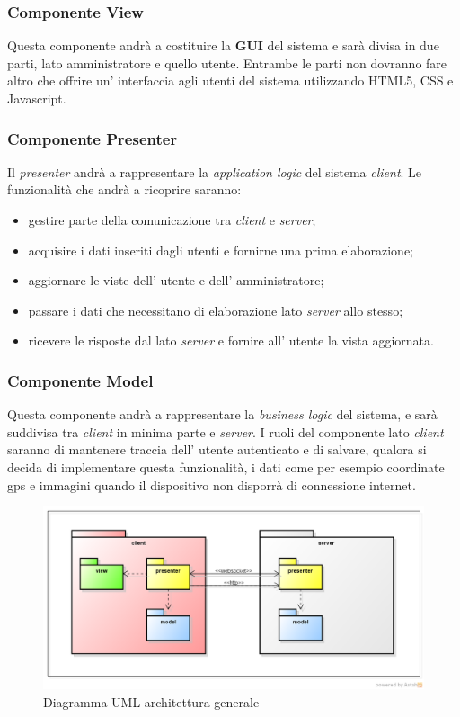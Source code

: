 \subsubsection{Componente View}
Questa componente andrà a costituire la \textbf{GUI} del sistema e sarà divisa in due parti, lato amministratore e quello utente. Entrambe le parti non dovranno fare altro che offrire un' interfaccia agli utenti del sistema utilizzando HTML5, CSS e Javascript.
\subsubsection{Componente Presenter}
Il \textit{presenter} andrà a rappresentare la \textit{application logic} del sistema \textit{client}. Le funzionalità che andrà a ricoprire saranno:
\begin{itemize}
	\item gestire parte della comunicazione tra \textit{client} e \textit{server};
	\item acquisire i dati inseriti dagli utenti e fornirne una prima elaborazione;
	\item aggiornare le viste dell' utente e dell' amministratore;
	\item passare i dati che necessitano di elaborazione lato \textit{server} allo stesso;
	\item ricevere le risposte dal lato \textit{server} e fornire all' utente la vista aggiornata.
\end{itemize}
\subsubsection{Componente Model}
Questa componente andrà a rappresentare la \textit{business logic} del sistema, e sarà suddivisa tra \textit{client} in minima parte e \textit{server}.
I ruoli del componente lato \textit{client} saranno di mantenere traccia dell' utente autenticato e di salvare, qualora si decida di implementare questa funzionalità, i dati come per esempio coordinate gps e immagini quando il dispositivo non disporrà di connessione internet.

\begin{figure}[H] \centering \includegraphics[width=%
\textwidth]
{./other/MVPIntroduzione.png} \caption{Diagramma UML architettura generale}
\end{figure}